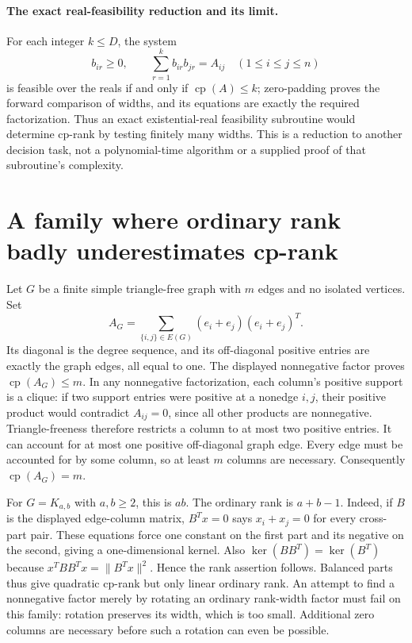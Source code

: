 \documentclass[11pt]{article}
\begin{document}
\paragraph{The exact real-feasibility reduction and its limit.}
For each integer $k\le D$, the system
\[
b_{ir}\ge0,\qquad\sum_{r=1}^k b_{ir}b_{jr}=A_{ij}
\quad(1\le i\le j\le n)
\]
is feasible over the reals if and only if $\operatorname{cp}(A)\le k$;
zero-padding proves the forward comparison of widths, and its equations
are exactly the required factorization. Thus an exact existential-real
feasibility subroutine would determine cp-rank by testing finitely many
widths. This is a reduction to another decision task, not a polynomial-time
algorithm or a supplied proof of that subroutine's complexity.

\section{A family where ordinary rank badly underestimates cp-rank}
Let $G$ be a finite simple triangle-free graph with $m$ edges and no isolated
vertices. Set
\[
A_G=\sum_{\{i,j\}\in E(G)}(e_i+e_j)(e_i+e_j)^T.
\]
Its diagonal is the degree sequence, and its off-diagonal positive entries
are exactly the graph edges, all equal to one. The displayed nonnegative
factor proves $\operatorname{cp}(A_G)\le m$.
In any nonnegative factorization, each column's positive support is a clique:
if two support entries were positive at a nonedge $i,j$, their positive
product would contradict $A_{ij}=0$, since all other products are nonnegative.
Triangle-freeness therefore restricts a column to at most two positive
entries. It can account for at most one positive off-diagonal graph edge.
Every edge must be accounted for by some column, so at least $m$ columns
are necessary. Consequently $\operatorname{cp}(A_G)=m$.

For $G=K_{a,b}$ with $a,b\ge2$, this is $ab$. The ordinary rank is
$a+b-1$. Indeed, if $B$ is the displayed edge-column matrix,
$B^Tx=0$ says $x_i+x_j=0$ for every cross-part pair. These equations force
one constant on the first part and its negative on the second, giving a
one-dimensional kernel. Also $\ker(BB^T)=\ker(B^T)$ because
$x^TBB^Tx=\|B^Tx\|^2$. Hence the rank assertion follows.
Balanced parts thus give quadratic cp-rank but only linear ordinary rank.
An attempt to find a nonnegative factor merely by rotating an ordinary
rank-width factor must fail on this family: rotation preserves its width,
which is too small. Additional zero columns are necessary before such a
rotation can even be possible.
\end{document}
